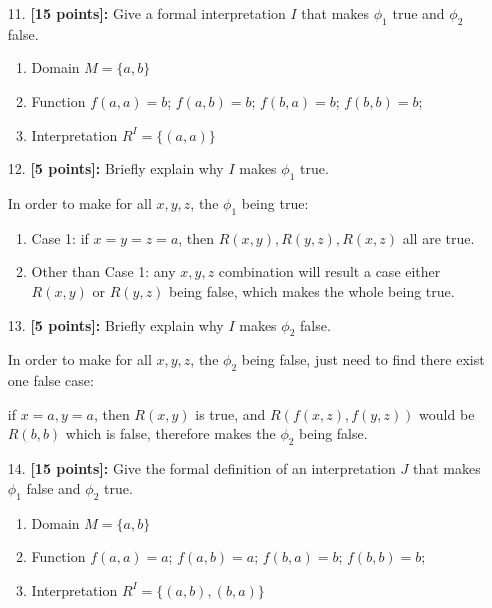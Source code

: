 \documentclass{article}
\begin{document}
\begin{enumerate}
\item[11.] \textbf{[15 points]:} Give a formal interpretation $I$ that
  makes $\phi_1$ true and $\phi_2$ false.

  \begin{answer}
    \begin{enumerate}
      \item Domain $M = \{a, b\}$
      \item Function $f(a,a) = b$; $f(a,b) = b$; $f(b,a) = b$; $f(b,b) = b$;
      \item Interpretation $R^I = \{(a, a)\} $
    \end{enumerate}
  \end{answer}
\end{enumerate}

\begin{enumerate}
\item[12.] \textbf{[5 points]:} Briefly explain why $I$ makes $\phi_1$
  true.
  \begin{answer}
    In order to make for all $x, y, z$, the $\phi_1$ being true:
    \begin{enumerate}
      \item Case 1: if $x = y = z = a$, then $R(x,y), R(y,z), R(x,z)$ all are true.
      \item Other than Case 1: any $x, y, z$ combination will result a case either 
      $R(x,y)$ or $R(y,z)$ being false, which makes the whole being true.
    \end{enumerate}
  \end{answer}
\end{enumerate}

\begin{enumerate}
\item[13.] \textbf{[5 points]:} Briefly explain why $I$ makes $\phi_2$
  false.
  \begin{answer}
    In order to make for all $x, y, z$, the $\phi_2$ being false, just need to find 
    there exist one false case:
    
    if $x = a, y = a$, then $R(x,y)$ is true, and $R(f(x,z),f(y,z))$ would be $R(b, b)$ 
    which is false, therefore makes the $\phi_2$ being false.
  \end{answer}
\end{enumerate}

\begin{enumerate}
\item[14.] \textbf{[15 points]:} Give the formal definition of an
  interpretation $J$ that makes $\phi_1$ false and $\phi_2$ true.
  
  \begin{answer}
    \begin{enumerate}
      \item Domain $M = \{a, b\}$
      \item Function $f(a,a) = a$; $f(a,b) = a$; $f(b,a) = b$; $f(b,b) = b$;
      \item Interpretation $R^I = \{(a, b), (b, a)\} $
    \end{enumerate}
  \end{answer}
\end{enumerate}
\end{document}

